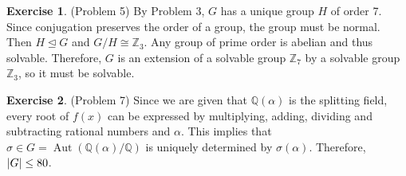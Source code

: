 \documentclass[12pt, psamsfonts]{amsart}
\theoremstyle{definition}
\newtheorem*{exer}{Exercise}
\theoremstyle{remark}
\DeclareMathOperator{\Aut}{Aut}
\numberwithin{equation}{section}
\begin{document}
\begin{exer}{(Problem 5)}
  By Problem 3, $G$ has a unique group $H$ of order 7.
  Since conjugation preserves the order of a group, the group must be normal.
  Then $H \trianglelefteq G$ and $G / H \cong \mathbb{Z}_3$.
  Any group of prime order is abelian and thus solvable.
  Therefore, $G$ is an extension of a solvable group $\mathbb{Z}_7$ by a solvable group $\mathbb{Z}_3$, so it must be solvable.
\end{exer}

\begin{exer}{(Problem 7)}
  Since we are given that $\mathbb{Q}(\alpha)$ is the splitting field, every root of $f(x)$ can be expressed by multiplying, adding, dividing and subtracting rational numbers and $\alpha$.
  This implies that $\sigma \in G = \Aut(\mathbb{Q}(\alpha)/\mathbb{Q})$ is uniquely determined by $\sigma(\alpha)$.
  Therefore, $\abs{G} \leq 80$.

\end{exer}
\end{document}
